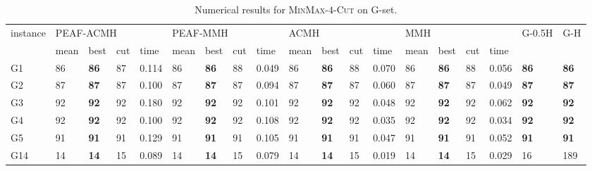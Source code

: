 \documentclass[12pt, a4paper]{article}%
\renewcommand{\arraystretch}{1.3}
\numberwithin{equation}{section}
\theoremstyle{plain}
\begin{document}
			
			{
				\scriptsize
				\setlength{\tabcolsep}{8.5pt}
				\renewcommand{\arraystretch}{1.2}
				\begin{landscape}
					\begin{longtable}{lllllllllllllllllll}
						\caption[Results for \textsc{MinMax}-$4$-\textsc{Cut}]{Numerical results for \textsc{MinMax}-$4$-\textsc{Cut} on G-set.}
						\label{tab::min-max4cut}\\
						\hline
						\multirow{2}{*}{instance} & \multicolumn{4}{l}{PEAF-ACMH}               & \multicolumn{4}{l}{PEAF-MMH}                & \multicolumn{4}{l}{ACMH}                   & \multicolumn{4}{l}{MMH}                    & \multirow{2}{*}{G-0.5H} & \multirow{2}{*}{G-H} \\ \cline{2-17}
						& mean    & best           & cut   & time      & mean    & best           & cut   & time     & mean    & best           & cut   & time      & mean    & best           & cut   & time     &                         &                      \\ \hline
						G1                        & 86   & \textbf{86} & 87  & 0.114  & 86   & \textbf{86} & 88  & 0.049  & 86   & \textbf{86} & 88  & 0.070  & 86   & \textbf{86} & 88  & 0.056   & \textbf{86}             & \textbf{86}          \\
						G2                        & 87   & \textbf{87} & 87  & 0.100  & 87   & \textbf{87} & 87  & 0.094  & 87   & \textbf{87} & 87  & 0.060  & 87   & \textbf{87} & 87  & 0.049   & \textbf{87}             & \textbf{87}          \\
						G3                        & 92   & \textbf{92} & 92  & 0.180  & 92   & \textbf{92} & 92  & 0.101  & 92   & \textbf{92} & 92  & 0.048  & 92   & \textbf{92} & 92  & 0.062   & \textbf{92}             & \textbf{92}          \\
						G4                        & 92   & \textbf{92} & 92  & 0.100  & 92   & \textbf{92} & 92  & 0.108  & 92   & \textbf{92} & 92  & 0.035  & 92   & \textbf{92} & 92  & 0.034   & \textbf{92}             & \textbf{92}          \\
						G5                        & 91   & \textbf{91} & 91  & 0.129  & 91   & \textbf{91} & 91  & 0.105  & 91   & \textbf{91} & 91  & 0.047  & 91   & \textbf{91} & 91  & 0.052   & \textbf{91}             & \textbf{91}          \\
						G14                       & 14   & \textbf{14} & 15  & 0.089  & 14   & \textbf{14} & 15  & 0.079  & 14   & \textbf{14} & 15  & 0.019  & 14   & \textbf{14} & 15  & 0.029   & 16                      & 189                  \\

\end{longtable}
\end{landscape}}
\end{document}
